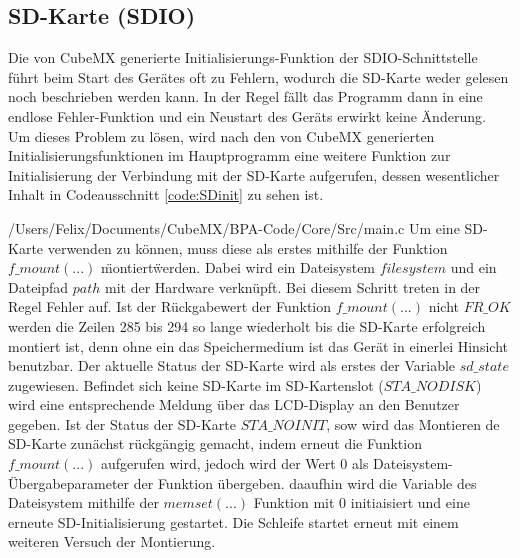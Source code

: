 
\subsection{SD-Karte (SDIO)}

Die von CubeMX generierte Initialisierungs-Funktion der SDIO-Schnittstelle führt beim Start des Gerätes oft zu Fehlern, wodurch die SD-Karte weder gelesen noch beschrieben werden kann. In der Regel fällt das Programm dann in eine endlose Fehler-Funktion und ein Neustart des Geräts erwirkt keine Änderung. Um dieses Problem zu lösen, wird nach den von CubeMX generierten Initialisierungsfunktionen im Hauptprogramm eine weitere Funktion zur Initialisierung der Verbindung mit der SD-Karte aufgerufen, dessen wesentlicher Inhalt in Codeausschnitt \ref{code:SDinit} zu sehen ist.

{/Users/Felix/Documents/CubeMX/BPA-Code/Core/Src/main.c}
Um eine SD-Karte verwenden zu können, muss diese als erstes mithilfe der Funktion $f\_mount(...)$ \"montiert\" werden. Dabei wird ein Dateisystem $filesystem$ und ein Dateipfad $path$ mit der Hardware verknüpft. Bei diesem Schritt treten in der Regel Fehler auf. Ist der Rückgabewert der Funktion $f\_mount(...)$ nicht $FR\_OK$ werden die Zeilen 285 bis 294 so lange wiederholt bis die SD-Karte erfolgreich montiert ist, denn ohne ein das Speichermedium ist das Gerät in einerlei Hinsicht benutzbar. Der aktuelle Status der SD-Karte wird als erstes der Variable $sd\_state$ zugewiesen. Befindet sich keine SD-Karte im SD-Kartenslot ($STA\_NODISK$) wird eine entsprechende Meldung über das LCD-Display an den Benutzer gegeben. Ist der Status der SD-Karte $STA\_NOINIT$, sow wird das Montieren de SD-Karte zunächst rückgängig gemacht, indem erneut die Funktion $f\_mount(...)$ aufgerufen wird, jedoch wird der Wert 0 als Dateisystem-Übergabeparameter der Funktion übergeben. daaufhin wird die Variable des Dateisystem mithilfe der $memset(...)$ Funktion mit 0 initiaisiert und eine erneute SD-Initialisierung gestartet. %
Die Schleife startet erneut mit einem weiteren Versuch der Montierung.

